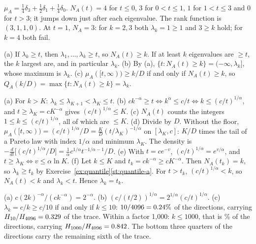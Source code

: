 $\mu_A=\frac14\delta_3+\frac12\delta_1+\frac14\delta_0$. $N_A(t)=4$ for $t\le0$, $3$ for $0<t\le1$, $1$ for $1<t\le3$
and $0$ for $t>3$; it jumps down just after each eigenvalue. The rank function is $(3,1,1,0)$. At $t=1$, $N_A=3$:
for $k=2,3$ both $\lambda_k=1\ge1$ and $3\ge k$ hold; for $k=4$ both fail.

(a) If $\lambda_k\ge t$, then $\lambda_1,\dots,\lambda_k\ge t$, so $N_A(t)\ge k$. If at least $k$ eigenvalues are
$\ge t$, the $k$ largest are, and in particular $\lambda_k$.
\newline (b) By (a), $\{t:N_A(t)\ge k\}=(-\infty,\lambda_k]$, whose maximum is $\lambda_k$.
\newline (c) $\mu_A([t,\infty))\ge k/D$ if and only if $N_A(t)\ge k$, so $Q_A(k/D)=\max\{t:N_A(t)\ge k\}=\lambda_k$.

(a) For $k>K$: $\lambda_k\le\lambda_{K+1}<\lambda_K\le t$.
\newline (b) $ck^{-\alpha}\ge t\iff k^\alpha\le c/t\iff k\le(c/t)^{1/\alpha}$, and $t\ge\lambda_K=cK^{-\alpha}$ gives
$(c/t)^{1/\alpha}\le K$.
\newline (c) $N_A(t)$ counts the integers $1\le k\le(c/t)^{1/\alpha}$, all of which are $\le K$.
\newline (d) Divide by $D$. Without the floor, $\mu_A([t,\infty))=(c/t)^{1/\alpha}/D=\frac KD(t/\lambda_K)^{-1/\alpha}$ on
$[\lambda_K,c]$: $K/D$ times the tail of a Pareto law with index $1/\alpha$ and minimum $\lambda_K$. The density is
$-\frac{d}{dt}\bigl[(c/t)^{1/\alpha}/D\bigr]=\frac1\alpha c^{1/\alpha}t^{-1/\alpha-1}/D$.
\newline (e) With $t=ce^{-v}$, $(c/t)^{1/\alpha}=e^{v/\alpha}$, and $t\ge\lambda_K\iff v\le\alpha\ln K$.
\newline (f) Let $k\le K$ and $t_k=ck^{-\alpha}\ge cK^{-\alpha}$. Then $N_A(t_k)=k$, so $\lambda_k\ge t_k$ by
Exercise~\ref{ex:quantile}\ref{st:quantile-a}. For $t>t_k$, $(c/t)^{1/\alpha}<k$, so $N_A(t)<k$ and $\lambda_k<t$.
Hence $\lambda_k=t_k$.

(a) $c(2k)^{-\alpha}/(ck^{-\alpha})=2^{-\alpha}$.
\newline (b) $(c/(t/2))^{1/\alpha}=2^{1/\alpha}(c/t)^{1/\alpha}$.
\newline (c) $\lambda_k=c/k\ge c/10$ if and only if $k\le10$: $10/4096=0.24\%$ of the directions, carrying
$H_{10}/H_{4096}=0.329$ of the trace. Within a factor 1{,}000: $k\le1000$, that is \NumDirWithinThousand\%
of the directions, carrying $H_{1000}/H_{4096}=0.842$. The bottom three quarters of the directions
carry the remaining sixth of the trace.

